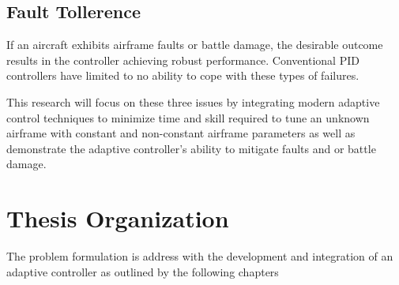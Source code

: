 \subsection{Fault Tollerence}
If an aircraft exhibits airframe faults or battle damage, the desirable outcome results in the controller achieving robust performance.  Conventional \ac{PID} controllers have limited to no ability to cope with these types of failures.

This research will focus on these three issues by integrating modern adaptive control techniques to minimize time and skill required to tune an unknown airframe with constant and non-constant airframe parameters as well as demonstrate the adaptive controller's ability to mitigate faults and or battle damage.

\section{Thesis Organization}

The problem formulation is address with the development and integration of an adaptive controller as outlined by the following chapters


